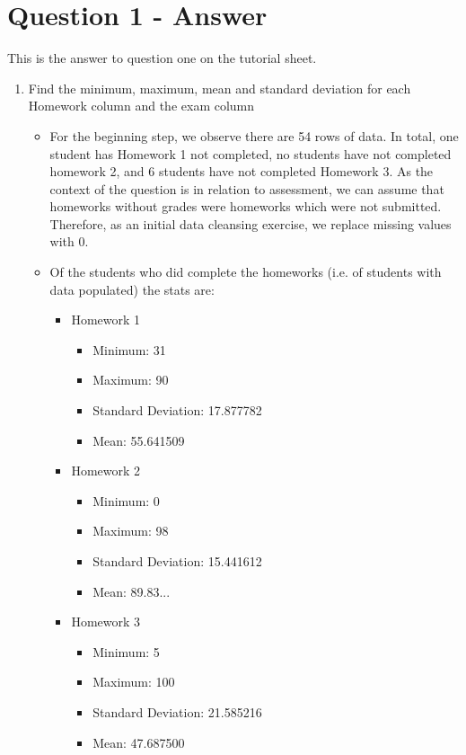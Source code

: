 \documentclass{scrreprt}
\begin{document}
	
\section{Question 1 - Answer}
This is the answer to question one on the tutorial sheet. 

\begin{enumerate}
	\item Find the minimum, maximum, mean and standard deviation for each Homework column and the exam column
\begin{itemize}
\item For the beginning step, we observe there are 54 rows of data. In total, one student has Homework 1 not completed, no students have not completed homework 2, and 6 students have not completed Homework 3. As the context of the question is in relation to assessment, we can assume that homeworks without grades were homeworks which were not submitted. Therefore, as an initial data cleansing exercise, we replace missing values with 0.
\item Of the students who did complete the homeworks (i.e. of students with data populated) the stats are:
\begin{itemize}
	\item Homework 1 \begin{itemize}
		\item Minimum: 31
		\item Maximum: 90
		\item Standard Deviation: 17.877782
		\item Mean: 55.641509
	\end{itemize}
	\item Homework 2
\begin{itemize}
	\item Minimum: 0
	\item Maximum: 98
	\item Standard Deviation: 15.441612	
	\item Mean: 89.83...
\end{itemize}
	\item Homework 3
\begin{itemize}
	\item Minimum: 5
	\item Maximum: 100
	\item Standard Deviation: 21.585216	
	\item Mean: 47.687500
\end{itemize}
\end{itemize}


\end{itemize}
\end{enumerate}
\end{document}
